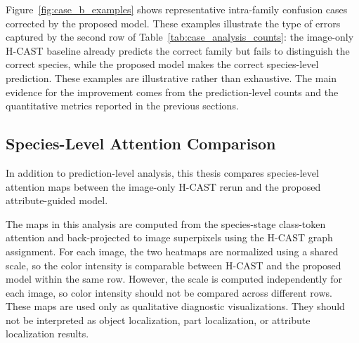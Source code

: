 Figure~\ref{fig:case_b_examples} shows representative intra-family confusion cases corrected by the proposed model. These examples illustrate the type of errors captured by the second row of Table~\ref{tab:case_analysis_counts}: the image-only H-CAST baseline already predicts the correct family but fails to distinguish the correct species, while the proposed model makes the correct species-level prediction. These examples are illustrative rather than exhaustive. The main evidence for the improvement comes from the prediction-level counts and the quantitative metrics reported in the previous sections.



















\subsection{Species-Level Attention Comparison}

In addition to prediction-level analysis, this thesis compares species-level attention maps between the image-only H-CAST rerun and the proposed attribute-guided model.

The maps in this analysis are computed from the species-stage class-token attention and back-projected to image superpixels using the H-CAST graph assignment. For each image, the two heatmaps are normalized using a shared scale, so the color intensity is comparable between H-CAST and the proposed model within the same row. However, the scale is computed independently for each image, so color intensity should not be compared across different rows. These maps are used only as qualitative diagnostic visualizations. They should not be interpreted as object localization, part localization, or attribute localization results.

